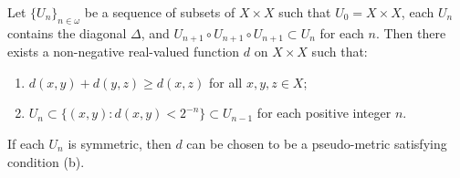 Let $\{U_n\}_{n \in \omega}$ be a sequence of subsets of $X \times X$ such that $U_0 = X \times X$, each $U_n$ contains the diagonal $\Delta$, and $U_{n+1} \circ U_{n+1} \circ U_{n+1} \subset U_n$ for each $n$. Then there exists a non-negative real-valued function $d$ on $X \times X$ such that:
\begin{enumerate}
\item[(a)] $d(x,y) + d(y,z) \geq d(x,z)$ for all $x, y, z \in X$;
\item[(b)] $U_n \subset \{(x,y) : d(x,y) < 2^{-n}\} \subset U_{n-1}$ for each positive integer $n$.
\end{enumerate}
If each $U_n$ is symmetric, then $d$ can be chosen to be a pseudo-metric satisfying condition (b).
